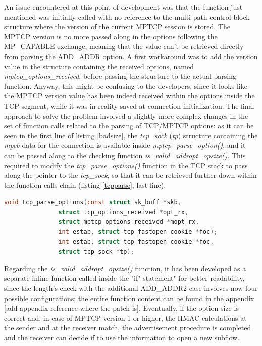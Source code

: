 An issue encountered at this point of development was that the function just mentioned was initially called with no reference to the multi-path control block structure where the version of the current MPTCP session is stored. The MPTCP version is no more passed along in the options following the MP\_CAPABLE exchange, meaning that the value can't be retrieved directly from parsing the ADD\_ADDR option. A first workaround was to add the version value in the structure containing the received options, named \textit{mptcp\_options\_received}, before passing the structure to the actual parsing function. Anyway, this might be confusing to the developers, since it looks like the MPTCP version value has been indeed received within the options inside the TCP segment, while it was in reality saved at connection initialization. The final approach to solve the problem involved a slightly more complex changes in the set of function calls related to the parsing of TCP/MPTCP options: as it can be seen in the first line of listing \ref{badsize}, the \textit{tcp\_sock} (\textit{tp}) structure containing the \textit{mpcb} data for the connection is available inside \textit{mptcp\_parse\_option()}, and it can be passed along to the checking function \textit{is\_valid\_addropt\_opsize()}. This required to modify the \textit{tcp\_parse\_options()} function in the TCP stack to pass along the pointer to the \textit{tcp\_sock}, so that it can be retrieved further down within the function calls chain (listing \ref{tcpparse}, last line).

\begin{lstlisting}[language=c, caption=\textit{New definition for \textit{tcp\_parse\_options}}, label=tcpparse]
void tcp_parse_options(const struct sk_buff *skb,
 		       struct tcp_options_received *opt_rx,
 		       struct mptcp_options_received *mopt_rx,
		       int estab, struct tcp_fastopen_cookie *foc);
		       int estab, struct tcp_fastopen_cookie *foc,
		       struct tcp_sock *tp);
\end{lstlisting}

Regarding the \textit{is\_valid\_addropt\_opsize()} function, it has been developed as a separate inline function called inside the "if" statement" for better readability, since the length's check with the additional ADD\_ADDR2 case involves now four possible configurations; the entire function content can be found in the appendix [add appendix reference where the patch is].
Eventually, if the option size is correct and, in case of MPTCP version 1 or higher, the HMAC calculations at the sender and at the receiver match, the advertisement procedure is completed and the receiver can decide if to use the information to open a new subflow.


